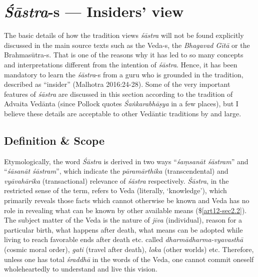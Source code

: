 \section{{{\sl\bfseries Śāstra}\relax}-s --- Insiders' view}\label{art12-sec2}

The basic details of how the tradition views {\sl śāstra} will not be found explicitly discussed in the main source texts such as the Veda-s, the {\sl Bhagavad Gītā} or the Brahmasūtra-s. That is one of the reasons why it has led to so many concepts and interpretations different from the intention of {\sl śāstra}. Hence, it has been mandatory to learn the {\sl śāstra}-s from a guru who is grounded in the tradition, described as ``insider'' (Malhotra 2016:24-28). Some of the very important features of {\sl śāstra} are discussed in this section according to the tradition of Advaita Vedānta (since Pollock quotes {\sl Śaṅkarabhāṣya} in a few places), but I believe these details are acceptable to other Vedāntic traditions by and large.

\subsection{Definition \& Scope}\label{art12-sec2.1}

Etymologically, the word {\sl Śāstra} is derived in two ways ``{\sl śaṃsanāt śāstram}'' and ``{\sl śāsanāt śāstram}'', which indicate the {\sl pāramārthika} (transcendental) and {\sl vyāvahārika} (transactional) relevance of {\sl śāstra} respectively. {\sl Śāstra}, in the restricted sense of the term, refers to Veda (literally, `knowledge'), which primarily reveals those facts which cannot otherwise be known and Veda has no role in revealing what can be known by other available means (\$\ref{art12-sec2.2}). The subject matter of the Veda is the nature of {\sl jīva} (individual), reason for a particular birth, what happens after death, what means can be adopted while living to reach favorable ends after death etc. called {\sl dharmādharma-vyavasthā} (cosmic moral order), {\sl gati} (travel after death), {\sl loka} (other worlds) etc. Therefore, unless one has total {\sl śraddhā} in the words of the Veda, one cannot commit oneself wholeheartedly to understand and live this vision. 

